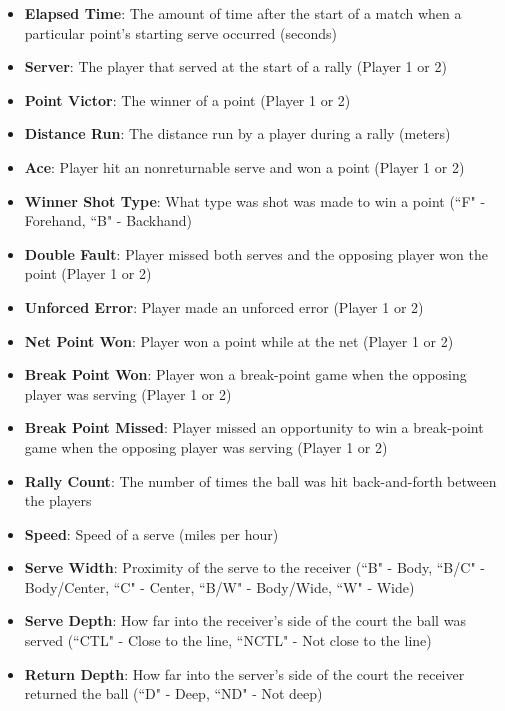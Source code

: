 \documentclass[letterpaper, 12pt]{article}
\begin{document}
        \begin{itemize}
            \item \textbf{Elapsed Time}: The amount of time after the start of a match when a particular point's starting serve occurred (seconds)
            \item \textbf{Server}: The player that served at the start of a rally (Player 1 or 2)
            \item \textbf{Point Victor}: The winner of a point (Player 1 or 2)
            \item \textbf{Distance Run}: The distance run by a player during a rally (meters)
            \item \textbf{Ace}: Player hit an nonreturnable serve and won a point (Player 1 or 2)
            \item \textbf{Winner Shot Type}: What type was shot was made to win a point (``F" - Forehand, ``B" - Backhand)
            \item \textbf{Double Fault}: Player missed both serves and the opposing player won the point (Player 1 or 2)
            \item \textbf{Unforced Error}: Player made an unforced error (Player 1 or 2)
            \item \textbf{Net Point Won}: Player won a point while at the net (Player 1 or 2)
            \item \textbf{Break Point Won}: Player won a break-point game when the opposing player was serving (Player 1 or 2)
            \item \textbf{Break Point Missed}: Player missed an opportunity to win a break-point game when the opposing player was serving (Player 1 or 2)
            \item \textbf{Rally Count}: The number of times the ball was hit back-and-forth between the players
            \item \textbf{Speed}: Speed of a serve (miles per hour)
            \item \textbf{Serve Width}: Proximity of the serve to the receiver (``B" - Body, ``B/C" - Body/Center, ``C" - Center, ``B/W" - Body/Wide, ``W" - Wide)
            \item \textbf{Serve Depth}: How far into the receiver's side of the court the ball was served (``CTL" - Close to the line, ``NCTL" - Not close to the line)
            \item \textbf{Return Depth}: How far into the server's side of the court the receiver returned the ball (``D" - Deep, ``ND" - Not deep)
        \end{itemize}
\end{document}
